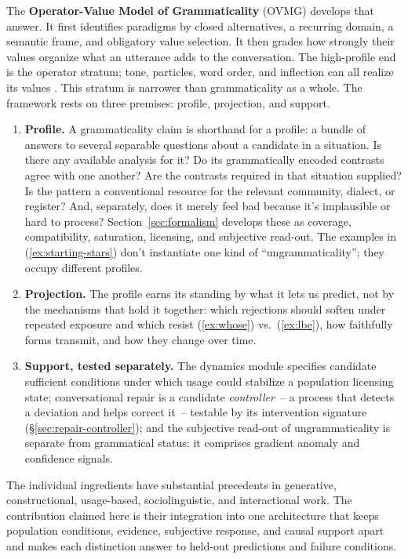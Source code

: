\documentclass[12pt,letterpaper]{article}
\begin{document}
The \textbf{Operator-Value Model of Grammaticality} (OVMG) develops that
answer. It first identifies paradigms by closed alternatives, a recurring
domain, a semantic frame, and obligatory value selection. It then grades how
strongly their values organize what an utterance adds to the conversation. The
high-profile end is the operator stratum; tone, particles, word order, and
inflection can all realize its values \autocite{reynolds2026operators}. This
stratum is narrower than grammaticality as a whole. The framework rests on
three premises: profile, projection, and support.

\begin{enumerate}
\item \textbf{Profile.} A grammaticality claim is shorthand for a profile: a bundle of answers to several separable questions about a candidate in a situation. Is there any available analysis for it? Do its grammatically encoded contrasts agree with one another? Are the contrasts required in that situation supplied? Is the pattern a conventional resource for the relevant community, dialect, or register? And, separately, does it merely feel bad because it's implausible or hard to process? Section~\ref{sec:formalism} develops these as coverage, compatibility, saturation, licensing, and subjective read-out. The examples in (\ref{ex:starting-stars}) don't instantiate one kind of \enquote{ungrammaticality}; they occupy different profiles.
\item \textbf{Projection.} The profile earns its standing by what it lets us predict, not by the mechanisms that hold it together: which rejections should soften under repeated exposure and which resist (\ref{ex:whose}) vs.\ (\ref{ex:lbe}), how faithfully forms transmit, and how they change over time.
\item \textbf{Support, tested separately.} The dynamics module specifies candidate sufficient conditions under which usage could stabilize a population licensing state; conversational repair is a candidate \emph{controller}~-- a process that detects a deviation and helps correct it~-- testable by its intervention signature (\S\ref{sec:repair-controller}); and the subjective read-out of ungrammaticality is separate from grammatical status: it comprises gradient anomaly and confidence signals.
\end{enumerate}

The individual ingredients have substantial precedents in generative,
constructional, usage-based, sociolinguistic, and interactional work. The
contribution claimed here is their integration into one architecture that keeps
population conditions, evidence, subjective response, and causal support apart
and makes each distinction answer to held-out predictions and failure
conditions.
\end{document}
